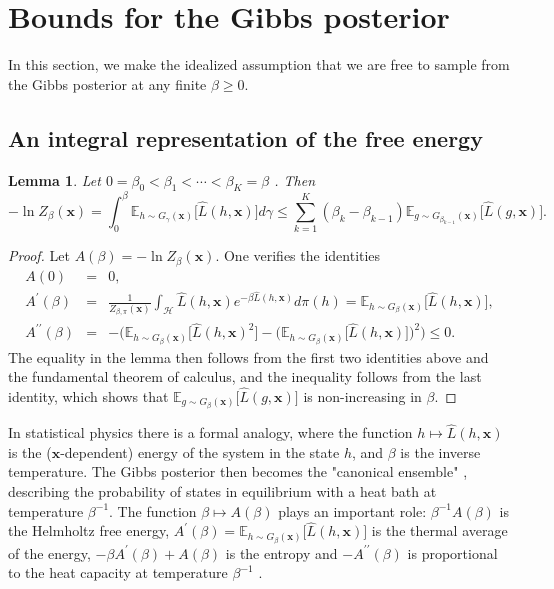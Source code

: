 \documentclass{article} %
\newtheorem{lemma}[theorem]{Lemma}
\begin{document}
\section{Bounds for the Gibbs posterior}

In this section, we make the idealized assumption that we are free to sample
from the Gibbs posterior at any finite $\beta \geq 0$.

\subsection{An integral representation of the free energy\label{Section integral representation}}

\begin{lemma}
\label{Lemma Derivatives}Let $0=\beta _{0}<\beta _{1}<\cdots<\beta _{K}=\beta $%
. Then%
\begin{equation*}
-\ln Z_{\beta }(\mathbf{x}) =\int_{0}^{\beta }\mathbb{E}_{h\sim
G_{\gamma }(\mathbf{x})}\big[ \hat{L}( h,\mathbf{x})\big] d\gamma \leq \sum_{k=1}^{K}(\beta_{k}-\beta_{k-1})\mathbb{E}_{g\sim G_{\beta _{k-1}}(\mathbf{x})}\big[ \hat{L}( g,\mathbf{x}) \big].
\end{equation*}
\end{lemma}
\begin{proof}
Let $A(\beta) =-\ln Z_{\beta}(\mathbf{x})$. One
verifies the identities
\begin{eqnarray*}
A(0) &=&0, \\
A^{\prime}(\beta) &=&\frac{1}{Z_{\beta,\pi}(\mathbf{x})}\int_{\mathcal{H}}\hat{L}(h,\mathbf{x})e^{-\beta\hat{L}(h,\mathbf{x}) }d\pi(h)=\mathbb{E}_{h\sim G_{\beta}(\mathbf{x})}\big[\hat{L}(h,\mathbf{x})
\big],\\
A^{\prime \prime}(\beta) &=&-\Big( \mathbb{E}_{h\sim G_{\beta
}(\mathbf{x})}\big[\hat{L}(h,\mathbf{x})^{2}
\big] -\big(\mathbb{E}_{h\sim G_{\beta}(\mathbf{x})}\big[\hat{L}(h,\mathbf{x}) \big] \big)^{2}\Big) \leq 0\text{.}
\end{eqnarray*}
The equality in the lemma then follows from the first two identities above and the fundamental theorem of calculus, and the inequality follows from the last identity, which shows that $\mathbb{E}_{g\sim G_{\beta 
}(\mathbf{x})}\big[\hat{L}( g,\mathbf{x})\big]$
is non-increasing in $\beta$.
\end{proof}
In statistical physics there is a formal analogy, where the function $h\mapsto \hat{L}(h,\mathbf{x})$ is the ($\mathbf{x}$-dependent) energy of the system in the state $h$, and $\beta$ is the inverse
temperature. The Gibbs posterior then becomes the "canonical ensemble" \citep{gibbs1902elementary},
describing the probability of states in equilibrium with a heat bath at temperature $\beta ^{-1}$. The function $\beta
\mapsto A(\beta)$ plays an important role: $\beta ^{-1}A(\beta) $ is the Helmholtz free energy, $A^{\prime}(\beta)=\mathbb{E}_{h\sim G_{\beta}(\mathbf{x})}\big[\hat{L}(h,\mathbf{x})\big]$ is the thermal average of the energy, $-\beta A^{\prime }(\beta)+A(\beta) $ is the entropy and $-A^{\prime \prime}(\beta )$ is proportional to the heat capacity at temperature $\beta ^{-1}$ \citep[see e.g.][]{huang2008statistical}.
\end{document}
